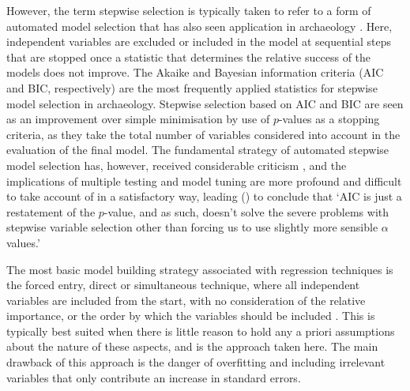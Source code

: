 \documentclass[12pt, a4paper]{article}
\begin{document}
However, the term stepwise selection is typically taken to refer to a form of automated model selection that has also seen application in archaeology \citep[e.g.][]{bevan2013, visentin2017, spencer2018, wachtel2018}. Here, independent variables are excluded or included in the model at sequential steps that are stopped once a statistic that determines the relative success of the models does not improve. The Akaike and Bayesian information criteria (AIC and BIC, respectively) are the most frequently applied statistics for stepwise model selection in archaeology. Stepwise selection based on AIC and BIC are seen as an improvement over simple minimisation by use of $p$-values as a stopping criteria, as they take the total number of variables considered into account in the evaluation of the final model. The fundamental strategy of automated stepwise model selection has, however, received considerable criticism \citep[e.g.][]{henderson1989, derksen1992, chatfield1995, malek2007, burnham2011, harrell2015}, and the implications of multiple testing and model tuning are more profound and difficult to take account of in a satisfactory way, leading \citeauthor{harrell2015} (\citeyear[][69]{harrell2015}) to conclude that `AIC is just a restatement of the $p$-value, and as such, doesn't solve the severe problems with stepwise variable selection other than forcing us to use slightly more sensible $\alpha$ values.' \par
The most basic model building strategy associated with regression techniques is the forced entry, direct or simultaneous technique, where all independent variables are included from the start, with no consideration of the relative importance, or the order by which the variables should be included \citep[e.g.][]{stoltzfus2011}. This is typically best suited when there is little reason to hold any a priori assumptions about the nature of these aspects, and is the approach taken here. The main drawback of this approach is the danger of overfitting and including irrelevant variables that only contribute an increase in standard errors. \par
\end{document}
